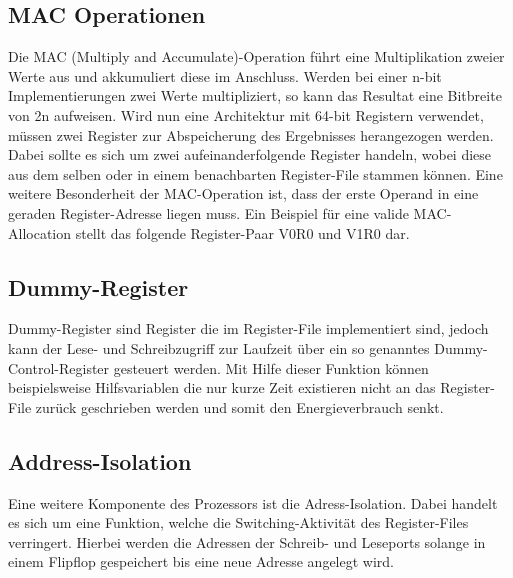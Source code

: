\subsection{MAC Operationen}\label{subsec:macMode}
Die MAC (Multiply and Accumulate)-Operation führt eine Multiplikation zweier Werte aus und akkumuliert diese im Anschluss. Werden bei einer n-bit Implementierungen zwei Werte multipliziert, so kann das Resultat eine Bitbreite von 2n aufweisen. Wird nun eine Architektur mit 64-bit Registern verwendet, müssen zwei Register zur Abspeicherung des Ergebnisses herangezogen werden. Dabei sollte es sich um zwei aufeinanderfolgende Register handeln, wobei diese aus dem selben oder in einem benachbarten Register-File stammen können. Eine weitere Besonderheit der MAC-Operation ist, dass der erste Operand in eine geraden Register-Adresse liegen muss. Ein Beispiel für eine valide MAC-Allocation stellt das folgende Register-Paar V0R0 und V1R0 dar.
  

\subsection{Dummy-Register}\label{subsec:dummy}
Dummy-Register sind Register die im Register-File implementiert sind, jedoch kann der Lese- und Schreibzugriff zur Laufzeit über ein so genanntes Dummy-Control-Register gesteuert werden. Mit Hilfe dieser Funktion können beispielsweise Hilfsvariablen die nur kurze Zeit existieren nicht an das Register-File zurück geschrieben werden und somit den Energieverbrauch senkt. 

\subsection{Address-Isolation}\label{subsec:add_iso}
Eine weitere Komponente des Prozessors ist die Adress-Isolation. Dabei handelt es sich um eine Funktion, welche die Switching-Aktivität des Register-Files verringert. Hierbei werden die Adressen der Schreib- und Leseports solange in einem Flipflop gespeichert bis eine neue Adresse angelegt wird.\cite{lukasglitches2017}


